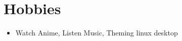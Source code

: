 \documentclass[10pt,a4paper,sans]{moderncv}        %
\begin{document}
	\section{Hobbies}

	\begin{itemize}
		
		\item  Watch Anime, Listen Music, Theming linux desktop
		
		
	\end{itemize}
%	
	
	
	
\end{document}

